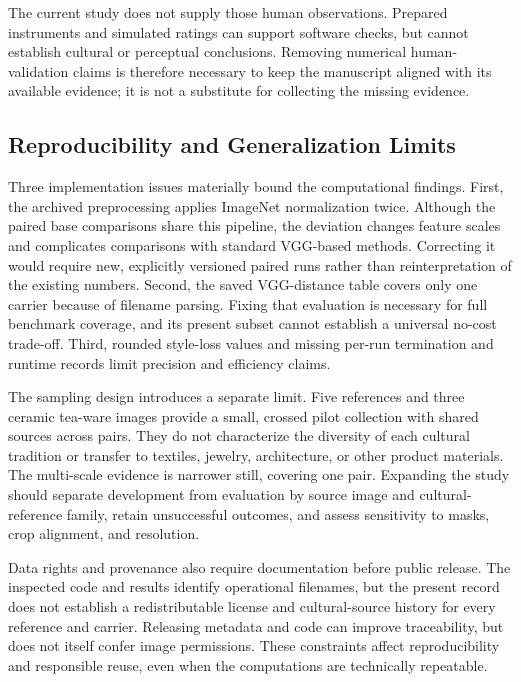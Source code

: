The current study does not supply those human observations. Prepared instruments and simulated ratings can support software checks, but cannot establish cultural or perceptual conclusions. Removing numerical human-validation claims is therefore necessary to keep the manuscript aligned with its available evidence; it is not a substitute for collecting the missing evidence.

\subsection{Reproducibility and Generalization Limits}
Three implementation issues materially bound the computational findings. First, the archived preprocessing applies ImageNet normalization twice. Although the paired base comparisons share this pipeline, the deviation changes feature scales and complicates comparisons with standard VGG-based methods. Correcting it would require new, explicitly versioned paired runs rather than reinterpretation of the existing numbers. Second, the saved VGG-distance table covers only one carrier because of filename parsing. Fixing that evaluation is necessary for full benchmark coverage, and its present subset cannot establish a universal no-cost trade-off. Third, rounded style-loss values and missing per-run termination and runtime records limit precision and efficiency claims.

The sampling design introduces a separate limit. Five references and three ceramic tea-ware images provide a small, crossed pilot collection with shared sources across pairs. They do not characterize the diversity of each cultural tradition or transfer to textiles, jewelry, architecture, or other product materials. The multi-scale evidence is narrower still, covering one pair. Expanding the study should separate development from evaluation by source image and cultural-reference family, retain unsuccessful outcomes, and assess sensitivity to masks, crop alignment, and resolution.

Data rights and provenance also require documentation before public release. The inspected code and results identify operational filenames, but the present record does not establish a redistributable license and cultural-source history for every reference and carrier. Releasing metadata and code can improve traceability, but does not itself confer image permissions. These constraints affect reproducibility and responsible reuse, even when the computations are technically repeatable.

